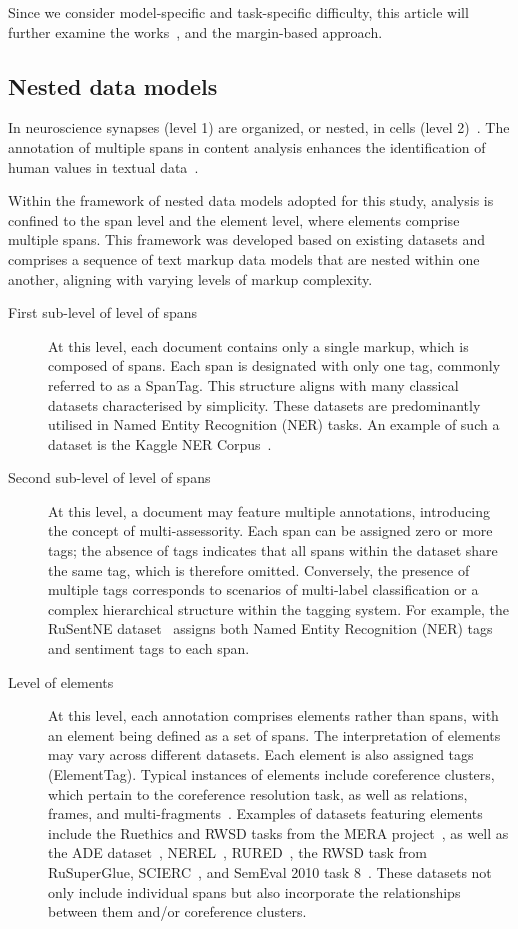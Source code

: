 \documentclass{article}
\begin{document}
Since we consider model-specific and task-specific difficulty, this article will further examine the works~\cite{Lee2018ASU, agarwal2022estimating}, and the margin-based approach.

\subsection{Nested data models}\label{nested}
In neuroscience synapses (level 1) are organized, or nested, in cells (level 2)~\cite{aarts2014solution}. The annotation of multiple spans in content analysis enhances the identification of human values in textual data~\cite{10893762, rink2024detecting, vorontsov2025detecting}.

Within the framework of nested data models adopted for this study, analysis is confined to the span level and the element level, where elements comprise multiple spans. This framework was developed based on existing datasets and comprises a sequence of text markup data models that are nested within one another, aligning with varying levels of markup complexity. 

\begin{description}
    \item[First sub-level of level of spans] At this level, each document contains only a single markup, which is composed of spans. Each span is designated with only one tag, commonly referred to as a SpanTag. This structure aligns with many classical datasets characterised by simplicity. These datasets are predominantly utilised in Named Entity Recognition (NER) tasks. An example of such a dataset is the Kaggle NER Corpus~\cite{kagglener}.
    \item[Second sub-level of level of spans] At this level, a document may feature multiple annotations, introducing the concept of multi-assessority. Each span can be assigned zero or more tags; the absence of tags indicates that all spans within the dataset share the same tag, which is therefore omitted. Conversely, the presence of multiple tags corresponds to scenarios of multi-label classification or a complex hierarchical structure within the tagging system. For example, the RuSentNE dataset~\cite{rusentne} assigns both Named Entity Recognition (NER) tags and sentiment tags to each span.
    \item[Level of elements] At this level, each annotation comprises elements rather than spans, with an element being defined as a set of spans. The interpretation of elements may vary across different datasets. Each element is also assigned tags (ElementTag). Typical instances of elements include coreference clusters, which pertain to the coreference resolution task, as well as relations, frames, and multi-fragments~\cite{10893762}. Examples of datasets featuring elements include the Ruethics and RWSD tasks from the MERA project~\cite{fenogenova-etal-2024-mera}, as well as the ADE dataset~\cite{ade}, NEREL~\cite{nerel}, RURED~\cite{rured}, the RWSD task from RuSuperGlue, SCIERC~\cite{scierc}, and SemEval 2010 task 8~\cite{hendrickx2019semeval}. These datasets not only include individual spans but also incorporate the relationships between them and/or coreference clusters.
\end{description}
\end{document}
